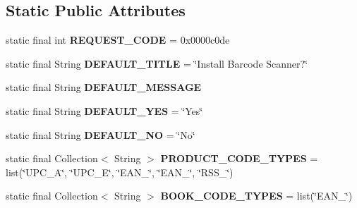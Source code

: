 \subsection*{Static Public Attributes}
\begin{DoxyCompactItemize}
\item 
\hypertarget{classcom_1_1lakehead_1_1textbookmarket_1_1_intent_integrator_a17149c367c1aa0c88beeefa3a8d37711}{static final int {\bfseries R\-E\-Q\-U\-E\-S\-T\-\_\-\-C\-O\-D\-E} = 0x0000c0de}\label{classcom_1_1lakehead_1_1textbookmarket_1_1_intent_integrator_a17149c367c1aa0c88beeefa3a8d37711}

\item 
\hypertarget{classcom_1_1lakehead_1_1textbookmarket_1_1_intent_integrator_a2283d20317c681eb4a69fee5f02cfd89}{static final String {\bfseries D\-E\-F\-A\-U\-L\-T\-\_\-\-T\-I\-T\-L\-E} = \char`\"{}Install Barcode Scanner?\char`\"{}}\label{classcom_1_1lakehead_1_1textbookmarket_1_1_intent_integrator_a2283d20317c681eb4a69fee5f02cfd89}

\item 
static final String {\bfseries D\-E\-F\-A\-U\-L\-T\-\_\-\-M\-E\-S\-S\-A\-G\-E}
\item 
\hypertarget{classcom_1_1lakehead_1_1textbookmarket_1_1_intent_integrator_a746afa96def3b6416ae9d0fde7fb603f}{static final String {\bfseries D\-E\-F\-A\-U\-L\-T\-\_\-\-Y\-E\-S} = \char`\"{}Yes\char`\"{}}\label{classcom_1_1lakehead_1_1textbookmarket_1_1_intent_integrator_a746afa96def3b6416ae9d0fde7fb603f}

\item 
\hypertarget{classcom_1_1lakehead_1_1textbookmarket_1_1_intent_integrator_a3d7ad49ea60bf3830348effd3af5ab55}{static final String {\bfseries D\-E\-F\-A\-U\-L\-T\-\_\-\-N\-O} = \char`\"{}No\char`\"{}}\label{classcom_1_1lakehead_1_1textbookmarket_1_1_intent_integrator_a3d7ad49ea60bf3830348effd3af5ab55}

\item 
\hypertarget{classcom_1_1lakehead_1_1textbookmarket_1_1_intent_integrator_a3f407ab728d371127a828c85b30da912}{static final Collection$<$ String $>$ {\bfseries P\-R\-O\-D\-U\-C\-T\-\_\-\-C\-O\-D\-E\-\_\-\-T\-Y\-P\-E\-S} = list(\char`\"{}U\-P\-C\-\_\-\-A\char`\"{}, \char`\"{}U\-P\-C\-\_\-\-E\char`\"{}, \char`\"{}E\-A\-N\-\_\char`\"{}, \char`\"{}E\-A\-N\-\_\char`\"{}, \char`\"{}R\-S\-S\-\_\char`\"{})}\label{classcom_1_1lakehead_1_1textbookmarket_1_1_intent_integrator_a3f407ab728d371127a828c85b30da912}

\item 
\hypertarget{classcom_1_1lakehead_1_1textbookmarket_1_1_intent_integrator_aa07f61d9bec9ff2f00f540979c1d657d}{static final Collection$<$ String $>$ {\bfseries B\-O\-O\-K\-\_\-\-C\-O\-D\-E\-\_\-\-T\-Y\-P\-E\-S} = list(\char`\"{}E\-A\-N\-\_\char`\"{})}\label{classcom_1_1lakehead_1_1textbookmarket_1_1_intent_integrator_aa07f61d9bec9ff2f00f540979c1d657d}


\end{DoxyCompactItemize}

